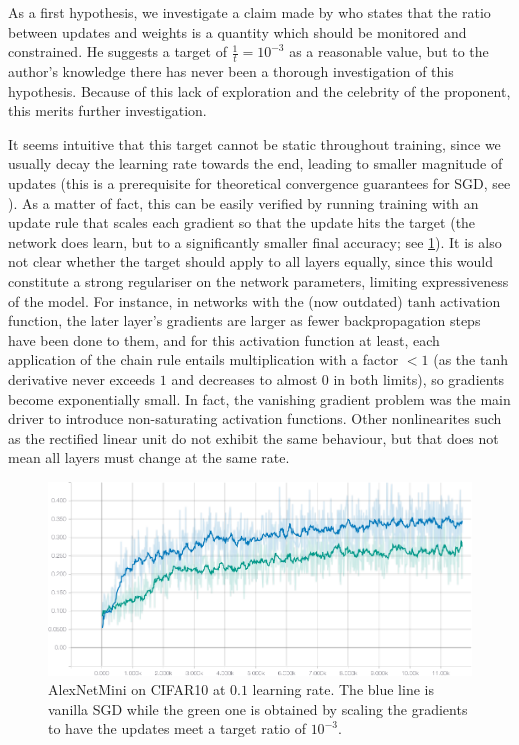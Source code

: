 As a first hypothesis, we investigate a claim made by \citet{karpathycs231n} who
states that the ratio between updates and weights is a quantity which should be
monitored and constrained. He suggests a target of $\frac{1}{t} = 10^{-3}$ as a
reasonable value, but to the author's knowledge there has never been a thorough
investigation of this hypothesis. Because of this lack of exploration and the
celebrity of the proponent, this merits further investigation.

It seems intuitive that this target cannot be static throughout training, since
we usually decay the learning rate towards the end, leading to smaller magnitude
of updates (this is a prerequisite for theoretical convergence guarantees for
SGD, see \citet[p. 20]{saad1998online}). As a matter of fact, this can be easily
verified by running training with an update rule that scales each gradient so
that the update hits the target (the network does learn, but to a significantly
smaller final accuracy; see \cref{fig:fixed-ratio-opt}). It is also not clear
whether the target should apply to all layers equally, since this would
constitute a strong regulariser on the network parameters, limiting
expressiveness of the model. For instance, in networks with the (now outdated)
$\text{tanh}$ activation function, the later layer's gradients are larger as
fewer backpropagation steps have been done to them, and for this activation
function at least, each application of the chain rule entails multiplication
with a factor $< 1$ (as the tanh derivative never exceeds $1$ and decreases to
almost $0$ in both limits), so gradients become exponentially small. In fact,
the vanishing gradient problem was the main driver to introduce non-saturating
activation functions.  Other nonlinearites such as the rectified linear unit do
not exhibit the same behaviour, but that does not mean all layers must change at
the same rate.

\begin{figure}
    \centering
    \includegraphics[width=\linewidth]{gfx/diagrams/experiments/ratio_loss_correlation/alexnetmini_sgd_fixed_ratio_01.pdf}
    \caption[Fixed-Ratio optimisation with AlexNetMini on CIFR10]{AlexNetMini on CIFAR10 at $0.1$ learning rate. The blue line is
    vanilla SGD while the green one is obtained by scaling the gradients to have
the updates meet a target ratio of $10^{-3}$.}
    \label{fig:fixed-ratio-opt}
\end{figure}

